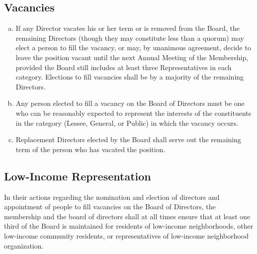 \subsection{Vacancies}
\begin{enumerate}[a.]
\item If any Director vacates his or her term or is removed from the
  Board, the remaining Directors (though they may constitute less than
  a quorum) may elect a person to fill the vacancy, or may, by
  unanimous agreement, decide to leave the position vacant until the
  next Annual Meeting of the Membership, provided the Board still
  includes at least three Representatives in each category. Elections
  to fill vacancies shall be by a majority of the remaining Directors.
\item Any person elected to fill a vacancy on the Board of Directors
  must be one who can be reasonably expected to represent the
  interests of the constituents in the category (Lessee, General, or
  Public) in which the vacancy occurs.
\item Replacement Directors elected by the Board shall serve out the
  remaining term of the person who has vacated the position.
\end{enumerate}

\subsection{Low-Income Representation}
In their actions regarding the nomination and election of directors
and appointment of people to fill vacancies on the Board of Directors,
the membership and the board of directors shall at all times ensure
that at least one third of the Board is maintained for residents of
low-income neighborhoods, other low-income community residents, or
representatives of low-income neighborhood organization.

